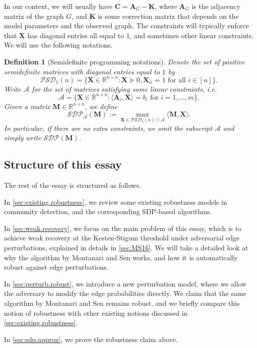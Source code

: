 \documentclass[11pt, titlepage]{article} %
\numberwithin{equation}{section}
\newtheorem{definition}{Definition}
\theoremstyle{definition}
\numberwithin{theorem}{section}
\numberwithin{lemma}{section}
\numberwithin{corollary}{section}
\numberwithin{proposition}{section}
\numberwithin{definition}{section}
\numberwithin{remark}{section}
\begin{document}
In our context, we will usually have $\bm{C} = \bm{A}_G - \bm{K}$, where $\bm{A}_G$ is the adjacency
matrix of the graph $G$, and $\bm{K}$ is some correction matrix that depends on the model parameters
and the observed graph. The constraints will typically enforce that $\bm{X}$ has diagonal entries 
all equal to $1$, and sometimes other linear constraints. We will use the following notations.
\begin{definition}[Semidefinite programming notations]
Denote the set of positive semidefinite matrices with diagonal entries equal to $1$ by
\[
\mathcal{PSD}_1(n) = \{\bm{X} \in \mathbb{R}^{n \times n} : \bm{X} \succeq 0, \bm{X}_{ii} = 1 \text{ for all } i \in [n]\}.
\]
Write $\mathcal{A}$ for the set of matrices satisfying some linear constraints, i.e.
\[\mathcal{A} = \{\bm{X} \in \mathbb{R}^{n \times n} : \langle \bm{A}_i, \bm{X} \rangle = b_i \text{ for } i = 1, \ldots, m\}.\]
Given a matrix $\bm{M} \in \mathbb{R}^{n \times n}$, we define 
\[\mathcal{SDP}_\mathcal{A}(\bm{M}) := \max_{\bm{X} \in \mathcal{PSD}_1(n) \cap \mathcal{A}} \langle \bm{M}, \bm{X} \rangle.\]
In particular, if there are no extra constraints, we omit the subscript $\mathcal{A}$ and simply 
write $\mathcal{SDP}(\bm{M})$.
\end{definition}
\subsection{Structure of this essay}
The rest of the essay is structured as follows. 

In \cref{sec:existing.robustness}, we review some existing robustness models in community detection,
and the corresponding SDP-based algorithms.

In \cref{sec:weak.recovery}, we focus on the main problem of this essay, which is to achieve
weak recovery at the Kesten-Stigum threshold under adversarial edge perturbations, explained in
details in \cref{sec:MS16}. We will take a detailed look at why the algorithm by Montanari and Sen
\cite{MS16} works, and how it is automatically robust against edge perturbations.

In \cref{sec:perturb.robust}, we introduce a new perturbation model, where we allow the adversary to
modify the edge probabilities directly. We claim that the same algorithm by Montanari and Sen remains
robust, and we briefly compare this notion of robustness with other existing notions discussed in 
\cref{sec:existing.robustness}.

In \cref{sec:sdp.approx}, we prove the robustness claim above.
\end{document}
